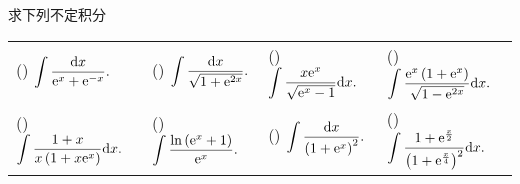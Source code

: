 \begin{example}
    求下列不定积分
    \setcounter{magicrownumbers}{0}
    \begin{table}[H]
        \centering
        \begin{tabular}{l | l | l | l}
            (\rownumber{}) $\displaystyle\int\frac{\dd x}{\mathrm{e} ^x+\mathrm{e} ^{-x}}.$            & (\rownumber{}) $\displaystyle\int\frac{\dd x}{\sqrt{1+\mathrm{e} ^{2x}}}.$       & (\rownumber{}) $\displaystyle\int\frac{x\mathrm{e} ^x}{\sqrt{\mathrm{e} ^x-1}}\dd x.$   & (\rownumber{}) $\displaystyle\int\frac{\mathrm{e} ^x\left(1+\mathrm{e} ^x\right)}{\sqrt{1-\mathrm{e} ^{2x}}}\dd x.$             \\
            (\rownumber{}) $\displaystyle\int\frac{1+x}{x\left(1+x\mathrm{e} ^x\right)}\dd x.$ & (\rownumber{}) $\displaystyle\int\frac{\ln\left(\mathrm{e} ^x+1\right)}{\mathrm{e} ^x}.$ & (\rownumber{}) $\displaystyle\int\frac{\dd x}{\left(1+\mathrm{e} ^x\right)^2}.$ & (\rownumber{}) $\displaystyle\int\dfrac{1+\mathrm{e} ^{\frac{x}{2}}}{\left(1+\mathrm{e} ^{\frac{x}{4}}\right)^2}\dd x.$
        \end{tabular}
    \end{table}
\end{example}
